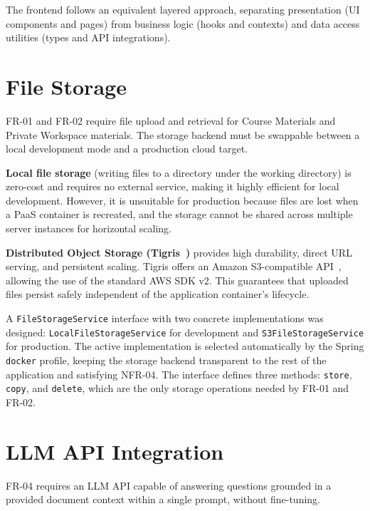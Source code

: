 The frontend follows an equivalent layered approach, separating presentation (UI components and pages) from business logic (hooks and contexts) and data access utilities (types and API integrations).

\clearpage
\section{File Storage}
\label{sec:storage-tech}

FR-01 and FR-02 require file upload and retrieval for Course Materials and Private Workspace
materials. The storage backend must be swappable between a local development mode and a
production cloud target.

\textbf{Local file storage} (writing files to a directory under the working directory) is zero-cost
and requires no external service, making it highly efficient for local development. However, it is
unsuitable for production because files are lost when a PaaS container is recreated, and the
storage cannot be shared across multiple server instances for horizontal scaling.

\textbf{Distributed Object Storage (Tigris~\cite{Tigris})} provides high durability, direct URL serving, and
persistent scaling. Tigris offers an Amazon S3-compatible API~\cite{AmazonS3}, allowing the use of the standard
AWS SDK v2. This guarantees that uploaded files persist safely independent of the application container's
lifecycle.

A \texttt{FileStorage\allowbreak Service} interface with two concrete implementations was designed:
\texttt{Local\allowbreak FileStorage\allowbreak Service} for development and \texttt{S3\allowbreak FileStorage\allowbreak Service} for production.
The active implementation is selected automatically by the Spring \texttt{docker} profile, keeping the storage
backend transparent to the rest of the application and satisfying NFR-04. The interface defines three methods:
\texttt{store}, \texttt{copy}, and \texttt{delete}, which are the only storage operations needed by FR-01 and FR-02.

\section{LLM API Integration}
\label{sec:ai-tech}

FR-04 requires an LLM API capable of answering questions grounded in a provided document context
within a single prompt, without fine-tuning.

